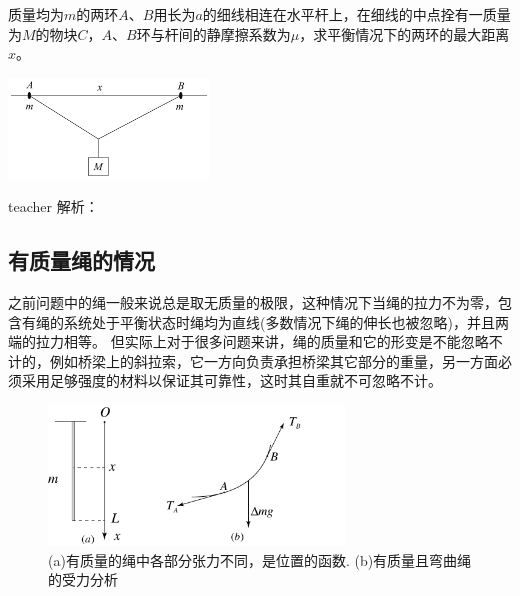 \begin{example}
质量均为$m$的两环$A$、$B$用长为$a$的细线相连在水平杆上，在细线的中点拴有一质量为$M$的物块$C$，$A、B$环与杆间的静摩擦系数为$\mu$，求平衡情况下的两环的最大距离$x$。
\begin{flushright}
\includegraphics[width = 0.4\textwidth]{images/static-force-14.pdf} 
\end{flushright}

\begin{taggedblock}{teacher}
\noindent
解析：
\end{taggedblock}
\end{example}

\subsection{有质量绳的情况}
之前问题中的绳一般来说总是取无质量的极限，这种情况下当绳的拉力不为零，包含有绳的系统处于平衡状态时绳均为直线(多数情况下绳的伸长也被忽略)，并且两端的拉力相等。
但实际上对于很多问题来讲，绳的质量和它的形变是不能忽略不计的，例如桥梁上的斜拉索，它一方向负责承担桥梁其它部分的重量，另一方面必须采用足够强度的材料以保证其可靠性，这时其自重就不可忽略不计。
\begin{figure}[htbp]
\begin{center}
\includegraphics[width = 0.7\textwidth]{images/static-force-29.pdf} 
\caption{(a)有质量的绳中各部分张力不同，是位置的函数. (b)有质量且弯曲绳的受力分析}
\label{fig: force-有质量的绳中各部分张力不同，是位置的函数}
\end{center}
\end{figure}




